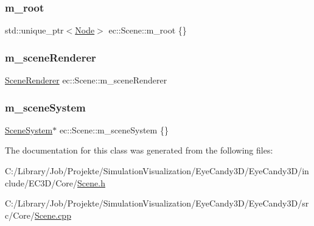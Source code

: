 \subsubsection{\texorpdfstring{m\+\_\+root}{m\_root}}
{\footnotesize\ttfamily std\+::unique\+\_\+ptr$<$\mbox{\hyperlink{classec_1_1_node}{Node}}$>$ ec\+::\+Scene\+::m\+\_\+root \{\}\hspace{0.3cm}{\ttfamily [protected]}}

\mbox{\label{classec_1_1_scene_a17a2c241cec6bda0a5895b353aa28fa7}} 
\subsubsection{\texorpdfstring{m\+\_\+scene\+Renderer}{m\_sceneRenderer}}
{\footnotesize\ttfamily \mbox{\hyperlink{classec_1_1_scene_renderer}{Scene\+Renderer}} ec\+::\+Scene\+::m\+\_\+scene\+Renderer\hspace{0.3cm}{\ttfamily [protected]}}

\mbox{\label{classec_1_1_scene_ad63e472baf8e283c596891384ea98aad}} 
\subsubsection{\texorpdfstring{m\+\_\+scene\+System}{m\_sceneSystem}}
{\footnotesize\ttfamily \mbox{\hyperlink{classec_1_1_scene_system}{Scene\+System}}$\ast$ ec\+::\+Scene\+::m\+\_\+scene\+System \{\}\hspace{0.3cm}{\ttfamily [protected]}}



The documentation for this class was generated from the following files\+:\begin{DoxyCompactItemize}
\item 
C\+:/\+Library/\+Job/\+Projekte/\+Simulation\+Visualization/\+Eye\+Candy3\+D/\+Eye\+Candy3\+D/include/\+E\+C3\+D/\+Core/\mbox{\hyperlink{_scene_8h}{Scene.\+h}}\item 
C\+:/\+Library/\+Job/\+Projekte/\+Simulation\+Visualization/\+Eye\+Candy3\+D/\+Eye\+Candy3\+D/src/\+Core/\mbox{\hyperlink{_scene_8cpp}{Scene.\+cpp}}\end{DoxyCompactItemize}
